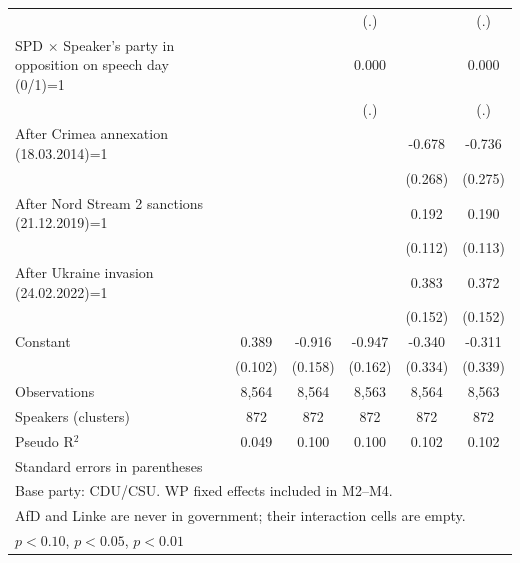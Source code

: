 \begin{table}[htbp]
\begin{tabular}{l*{5}{c}}
                    &                     &                     &         (.)         &                     &         (.)         \\
\addlinespace
SPD $\times$ Speaker's party in opposition on speech day (0/1)=1&                     &                     &       0.000         &                     &       0.000         \\
                    &                     &                     &         (.)         &                     &         (.)         \\
\addlinespace
After Crimea annexation (18.03.2014)=1&                     &                     &                     &      -0.678\sym{**} &      -0.736\sym{***}\\
                    &                     &                     &                     &     (0.268)         &     (0.275)         \\
\addlinespace
After Nord Stream 2 sanctions (21.12.2019)=1&                     &                     &                     &       0.192\sym{*}  &       0.190\sym{*}  \\
                    &                     &                     &                     &     (0.112)         &     (0.113)         \\
\addlinespace
After Ukraine invasion (24.02.2022)=1&                     &                     &                     &       0.383\sym{**} &       0.372\sym{**} \\
                    &                     &                     &                     &     (0.152)         &     (0.152)         \\
\addlinespace
Constant            &       0.389\sym{***}&      -0.916\sym{***}&      -0.947\sym{***}&      -0.340         &      -0.311         \\
                    &     (0.102)         &     (0.158)         &     (0.162)         &     (0.334)         &     (0.339)         \\
\midrule
Observations        &       8,564         &       8,564         &       8,563         &       8,564         &       8,563         \\
Speakers (clusters) &         872         &         872         &         872         &         872         &         872         \\
Pseudo R$^2$        &       0.049         &       0.100         &       0.100         &       0.102         &       0.102         \\
\bottomrule
\multicolumn{6}{l}{\footnotesize Standard errors in parentheses}\\
\multicolumn{6}{l}{\footnotesize Base party: CDU/CSU. WP fixed effects included in M2--M4.}\\
\multicolumn{6}{l}{\footnotesize AfD and Linke are never in government; their interaction cells are empty.}\\
\multicolumn{6}{l}{\footnotesize \sym{*} \(p<0.10\), \sym{**} \(p<0.05\), \sym{***} \(p<0.01\)}\\
\end{tabular}
\end{table}
